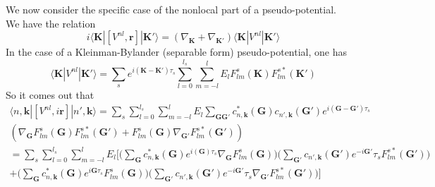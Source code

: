 \documentclass[a4paper,11pt]{report}
\renewcommand{\vec}[1]{\mathbf{#1}}
\newcommand{\bra}{\langle}
\newcommand{\ket}{\rangle}
\begin{document}
We now consider the specific case of the nonlocal part of a
pseudo-potential.\\
We have the relation
\begin{equation}
  i\bra
\vec{K}|[V^{nl},\vec{r}]|\vec{K'}\ket=(\nabla_{\vec{K}}+\nabla_{\vec{K'}})\bra
\vec{K}|V^{nl}|\vec{K'}\ket
\end{equation}
In the case of a Kleinman-Bylander (separable form) pseudo-potential,
one has
\begin{equation}
  \bra \vec{K}|V^{nl}|\vec{K'}\ket = \sum_s
e^{i(\vec{K}-\vec{K'})\tau_s}
\sum_{l=0}^{l_s}\sum_{m=-l}^{l}E_lF_{lm}^s(\vec{K})F_{lm}^{s*}(\vec{K'})
\end{equation}
So it comes out that
\begin{eqnarray}
  \bra n,\vec{k}|[V^{nl},i\vec{r}]|n',\vec{k}\ket = \sum_s
\sum_{l=0}^{l_s}\sum_{m=-l}^{l}E_l \sum_{\vec{G}\vec{G'}}
c^*_{n,\vec{k}}(\vec{G})c_{n',\vec{k}}(\vec{G'})
e^{i(\vec{G}-\vec{G'})\tau_s} \nonumber\\
( \nabla_{\vec{G}}F_{lm}^s(\vec{G})F_{lm}^{s*}(\vec{G'}) +
F_{lm}^s(\vec{G})\nabla_{\vec{G'}}F_{lm}^{s*}(\vec{G'}) ) \nonumber\\
= \sum_s \sum_{l=0}^{l_s}\sum_{m=-l}^{l}E_l \Bigg[
\Bigg(\sum_{\vec{G}}c^*_{n,\vec{k}}(\vec{G})e^{i(\vec{G})\tau_s}\nabla_{\vec{G}}F_{lm}^s(\vec{G})\Bigg)\Bigg(\sum_{\vec{G'}}c_{n',\vec{k}}(\vec{G'})
e^{-i\vec{G'}}\tau_sF_{lm}^{s*}(\vec{G'})\Bigg) \nonumber\\
+
\Bigg(\sum_{\vec{G}}c^*_{n,\vec{k}}(\vec{G})e^{i\vec{G}\tau_s}F_{lm}^s(\vec{G})\Bigg)\Bigg(\sum_{\vec{G'}}c_{n',\vec{k}}(\vec{G'})
e^{-i\vec{G'}}\tau_s\nabla_{\vec{G'}}F_{lm}^{s*}(\vec{G'})\Bigg) \Bigg]
\end{eqnarray}
\end{document}
